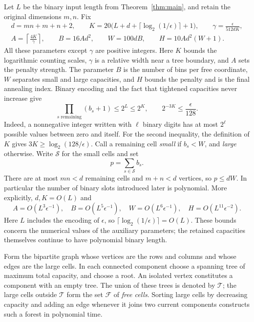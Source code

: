 Let $L$ be the binary input length from Theorem~\ref{thm:main}, and
retain the original dimensions $m,n$.  Fix
\begin{equation}\label{eq:parameters}
\begin{gathered}
d=mn+m+n+2,\qquad
K=20\bigl(L+d+\lceil\log_2(1/\epsilon)\rceil+1\bigr),
\qquad \gamma=\frac{\epsilon}{512dK},\\
A=\left\lceil\frac{4K}{\gamma}\right\rceil,\qquad
B=16Ad^2,\qquad W=100dB,\qquad H=10Ad^2(W+1).
\end{gathered}
\end{equation}
All these parameters except $\gamma$ are positive integers.
Here $K$ bounds the logarithmic counting scales, $\gamma$ is a relative
width near a tree boundary, and $A$ sets the penalty strength. The
parameter $B$ is the number of bins per free coordinate, $W$ separates
small and large capacities, and $H$ bounds the penalty and is the final
annealing index. Binary encoding and the fact that tightened capacities
never increase give
\begin{equation}\label{eq:capacity-product}
\prod_{s\text{ remaining}}(b_s+1)\le 2^L\le 2^K,
\qquad 2^{-3K}\le\frac{\epsilon}{128}.
\end{equation}
Indeed, a nonnegative integer written with $\ell$ binary digits has
at most $2^\ell$ possible values between zero and itself.  For the
second inequality, the definition of $K$ gives
$3K\ge\log_2(128/\epsilon)$.
Call a remaining cell \emph{small} if $b_s<W$, and \emph{large}
otherwise.  Write $\mathcal S$ for the small cells and set
\[
p=\sum_{s\in\mathcal S}b_s.
\]
There are at most $mn<d$ remaining cells and $m+n<d$ vertices,
so $p\le dW$.  In particular the number of binary slots introduced
later is polynomial.  More explicitly, $d,K=O(L)$ and
\[
A=O(L^3\epsilon^{-1}),\quad
B=O(L^5\epsilon^{-1}),\quad
W=O(L^6\epsilon^{-1}),\quad
H=O(L^{11}\epsilon^{-2}).
\]
Here $L$ includes the encoding of $\epsilon$, so
$\lceil\log_2(1/\epsilon)\rceil=O(L)$.  These bounds concern the
numerical values of the auxiliary parameters; the retained capacities
themselves continue to have polynomial binary length.

Form the bipartite graph whose vertices are the rows and columns and
whose edges are the large cells.  In each connected component choose
a spanning tree of maximum total capacity, and choose a root.  An
isolated vertex constitutes a component with an empty tree.  The
union of these trees is denoted by $\mathcal T$; the large cells
outside $\mathcal T$ form the set $\mathcal F$ of \emph{free cells}.
Sorting large cells by decreasing capacity and adding an edge whenever
it joins two current components constructs such a forest in
polynomial time.

